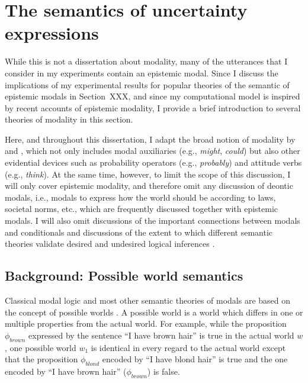\section{The semantics of uncertainty expressions}

While this is not a dissertation about modality, many of the utterances that I consider in my experiments contain an epistemic modal.
Since I discuss the implications of my experimental results for popular theories of the semantic of epistemic modals in Section~{XXX}, and since 
my computational model is inspired by recent accounts of epistemic modality, I provide a brief introduction to several theories of modality in this section.

Here, and throughout this dissertation, I adapt the broad notion of modality by \cite{Portner2009} and \cite{Kratzer2012Ch2}, which not only 
includes modal auxiliaries (e.g., \textit{might}, \textit{could}) but also other evidential devices such as probability operators 
(e.g., \textit{probably}) and attitude verbs (e.g., \textit{think}). At the same time, however, to limit the scope of this discussion,  
I will only cover epistemic modality, and therefore omit any discussion of deontic modals, i.e., modals to express how the 
world should be according to laws, societal norms, etc., which are frequently discussed together with epistemic modals.
I will also omit discussions of the important connections between modals and conditionals \cite{see e.g., Lewis1973?,Kratzer1978,Kratzer1979,Kratzer2012}
and discussions of the extent to which different semantic theories validate desired and undesired logical inferences \cite{see e.g., Yalcin2010}.

\subsection{Background: Possible world semantics}

Classical modal logic and most other semantic theories of modals are based on the concept of possible worlds \cite{kripke1963}.
A possible world is a world which differs in one or multiple properties from the actual world. For example, while the proposition $\phi_{brown}$
expressed by the  sentence ``I have brown hair'' is true in the actual world $w$, one possible world $w_1$ is identical in every regard to 
the actual world except that the proposition $\phi_{blond}$ encoded by ``I have blond hair'' is true and the one encoded by
``I have brown hair'' ($\phi_{brown}$) is false. 

